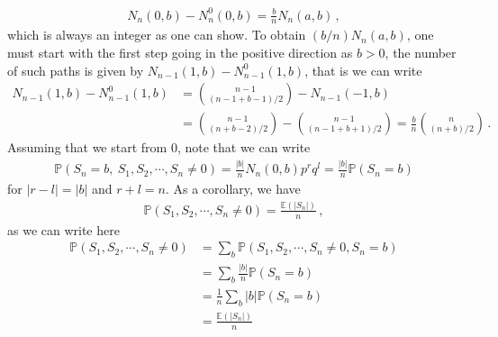 \documentclass[11pt, onesided]{book}
\theoremstyle{break}
\theoremstyle{break}
\begin{document}
\begin{align*}
N_n(0,b) - N_n^0(0,b) = \frac{b}{n}N_n(a,b)\,,
\end{align*}
which is always an integer as one can show. To obtain $(b/n)N_n(a,b)$, one must start with the first step going in the positive direction as $b>0$, the number of such paths is given by $N_{n-1}(1,b) - N_{n-1}^0(1,b)$, that is we can write
\begin{align*}
N_{n-1}(1,b) - N_{n-1}^0(1,b) 
&= \binom{n-1}{(n-1+b-1)/2} - N_{n-1}(-1,b) \\
&= \binom{n-1}{(n+b-2)/2} - \binom{n-1}{(n-1+b+1)/2}= \frac{b}{n}\binom{n}{(n+b)/2}\,.
\end{align*} 
Assuming that we start from $0$, note that we can write
\begin{align*}
\mathbb{P}(S_n=b,\ S_1,S_2,\cdots, S_{n} \neq 0) = \frac{|b|}{n}N_n(0,b) p^rq^l =  \frac{|b|}{n}\mathbb{P}(S_n = b)
\end{align*}
for $|r-l| = |b|$ and $r+l =n$. As a corollary, we have
\begin{align*}
\mathbb{P}(S_1,S_2,\cdots, S_n \neq 0) = \frac{\mathbb{E}(|S_n|)}{n}\,,
\end{align*}
as we can write here
\begin{align*}
\mathbb{P}(S_1,S_2,\cdots, S_n\neq 0) 
&= \sum_{b}\mathbb{P}(S_1,S_2,\cdots, S_n \neq 0, S_n = b)\\
&= \sum_b \frac{|b|}{n}\mathbb{P}(S_n = b)\\
&= \frac{1}{n}\sum_b |b| \mathbb{P}(S_n =b)\\
&= \frac{\mathbb{E}(|S_n|)}{n}
\end{align*}
\end{document}
